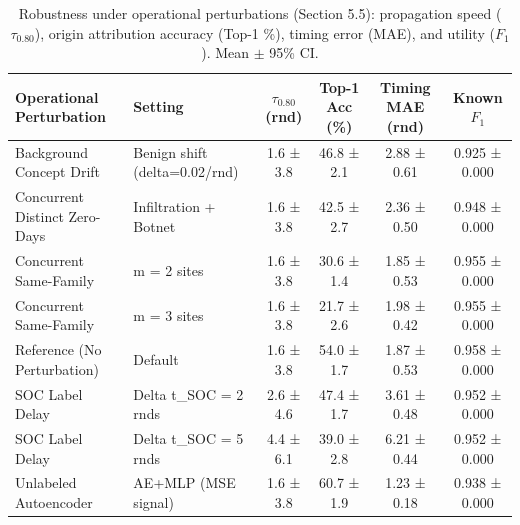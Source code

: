 \begin{table}[t]
\centering
\small
\caption{Robustness under operational perturbations (Section 5.5): propagation speed ($\tau_{0.80}$), origin attribution accuracy (Top-1 \%), timing error (MAE), and utility ($F_1$). Mean $\pm$ 95\% CI.}
\label{tab:robustness}
\begin{tabular}{llcccc}
\toprule
Operational Perturbation & Setting & $\tau_{0.80}$ (rnd) & Top-1 Acc (\%) & Timing MAE (rnd) & Known $F_1$ \\
\midrule
Background Concept Drift & Benign shift (delta=0.02/rnd) & 1.6 ± 3.8 & 46.8 ± 2.1 & 2.88 ± 0.61 & 0.925 ± 0.000 \\
Concurrent Distinct Zero-Days & Infiltration + Botnet & 1.6 ± 3.8 & 42.5 ± 2.7 & 2.36 ± 0.50 & 0.948 ± 0.000 \\
Concurrent Same-Family & m = 2 sites & 1.6 ± 3.8 & 30.6 ± 1.4 & 1.85 ± 0.53 & 0.955 ± 0.000 \\
Concurrent Same-Family & m = 3 sites & 1.6 ± 3.8 & 21.7 ± 2.6 & 1.98 ± 0.42 & 0.955 ± 0.000 \\
Reference (No Perturbation) & Default & 1.6 ± 3.8 & 54.0 ± 1.7 & 1.87 ± 0.53 & 0.958 ± 0.000 \\
SOC Label Delay & Delta t_SOC = 2 rnds & 2.6 ± 4.6 & 47.4 ± 1.7 & 3.61 ± 0.48 & 0.952 ± 0.000 \\
SOC Label Delay & Delta t_SOC = 5 rnds & 4.4 ± 6.1 & 39.0 ± 2.8 & 6.21 ± 0.44 & 0.952 ± 0.000 \\
Unlabeled Autoencoder & AE+MLP (MSE signal) & 1.6 ± 3.8 & 60.7 ± 1.9 & 1.23 ± 0.18 & 0.938 ± 0.000 \\
\bottomrule
\end{tabular}
\end{table}
